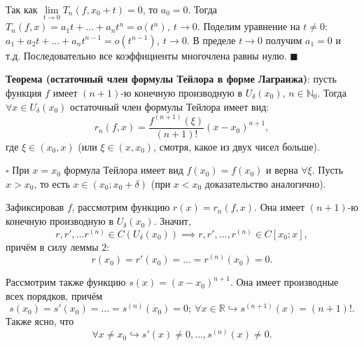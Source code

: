 \documentclass[12pt, a4paper, reqno]{article}
\begin{document}
    Так как $\lim\limits_{t\to 0} T_n(f, x_0 + t) = 0$, то $a_0 = 0$. Тогда
    $T_n(f, x) = a_1t + \ldots + a_nt^n = o(t^n),\ t \to 0$. Поделим уравнение на
    $t\neq 0$: $a_1 + a_2t + \ldots + a_nt^{n - 1} = o(t^{n - 1}),\ t \to 0$. В пределе $t\to 0$
    получим $a_1 = 0$ и т.д. Последовательно все коэффициенты многочлена равны нулю. $\blacksquare$

    \textbf{Теорема (остаточный член формулы Тейлора в форме Лагранжа)}: пусть функция $f$ имеет
    $(n + 1)$-ю конечную производную в $U_{\delta}(x_0)$, $n\in\mathbb{N}_0$. Тогда
    $\forall x\in U_{\delta}(x_0)$ остаточный член формулы Тейлора имеет вид:
    \begin{equation*}
        r_n(f, x) = \dfrac{f^{(n + 1)}(\xi)}{(n + 1)!}(x - x_0)^{n + 1},
    \end{equation*}
    где $\xi\in(x_0, x)$ (или $\xi\in(x, x_0)$, смотря, какое из двух чисел больше).

    $\square$ При $x = x_0$ формула Тейлора имеет вид $f(x_0) = f(x_0)$ и верна $\forall\xi$. Пусть
    $x > x_0$, то есть $x\in(x_0; x_0 + \delta)$ (при $x < x_0$ доказательство аналогично).

    Зафиксировав $f$, рассмотрим функцию $r(x) = r_n(f, x)$. Она имеет $(n + 1)$-ю конечную производную в
    $U_{\delta}(x_0)$. Значит,
    \begin{equation*}
        r, r', \ldots r^{(n)} \in C(U_{\delta}(x_0)) \implies r, r', \ldots, r^{(n)} \in C[x_0; x],
    \end{equation*}
    причём в силу леммы 2:
    \begin{equation*}
        r(x_0) = r'(x_0) = \ldots = r^{(n)}(x_0) = 0.
    \end{equation*}

    Рассмотрим также функцию $s(x) = (x - x_0)^{n + 1}$. Она имеет производные всех порядков, причём
    \begin{equation*}
        s(x_0) = s'(x_0) = \ldots = s^{(n)}(x_0) = 0;\
        \forall x \in \mathbb{R} \hookrightarrow s^{(n + 1)}(x) = (n + 1)!.
    \end{equation*}
    Также ясно, что
    \begin{equation*}
        \forall x \neq x_0 \hookrightarrow s'(x) \neq 0, \ldots, s^{(n)}(x) \neq 0.
    \end{equation*}
\end{document}
